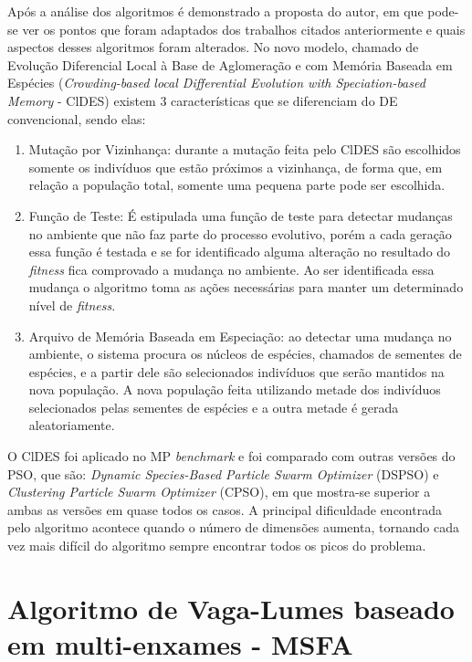 Após a análise dos algoritmos é demonstrado a proposta do autor, em que pode-se ver os pontos que foram adaptados dos trabalhos citados anteriormente e quais aspectos desses algoritmos foram alterados. No novo modelo, chamado de Evolução Diferencial Local à Base de Aglomeração e com Memória Baseada em Espécies (\textit{Crowding-based local Differential Evolution with Speciation-based Memory} - ClDES) existem 3 características que se diferenciam do DE convencional, sendo elas:

\begin{enumerate}
\item Mutação por Vizinhança: durante a mutação feita pelo ClDES são escolhidos somente os indivíduos que estão próximos a vizinhança, de forma que, em relação a população total, somente uma pequena parte pode ser escolhida.

\item Função de Teste: É estipulada uma função de teste para detectar mudanças no ambiente que não faz parte do processo evolutivo, porém a cada geração essa função é testada e se for identificado alguma alteração no resultado do \textit{fitness} fica comprovado a mudança no ambiente. Ao ser identificada essa mudança o algoritmo toma as ações necessárias para manter um determinado nível de \textit{fitness}.

\item Arquivo de Memória Baseada em Especiação: ao detectar uma mudança no ambiente, o sistema procura os núcleos de espécies, chamados de sementes de espécies, e a partir dele são selecionados indivíduos que serão mantidos na nova população. A nova população feita utilizando metade dos indivíduos selecionados pelas sementes de espécies e a outra metade é gerada aleatoriamente.
\end{enumerate}

O ClDES foi aplicado no MP \textit{benchmark} e foi comparado com outras versões do PSO, que são: \textit{Dynamic Species-Based Particle Swarm Optimizer} (DSPSO) e \textit{Clustering Particle Swarm Optimizer} (CPSO), em que mostra-se superior a ambas as versões em quase todos os casos. A principal dificuldade encontrada pelo algoritmo acontece quando o número de dimensões aumenta, tornando cada vez mais difícil do algoritmo sempre encontrar todos os picos do problema.

\section{Algoritmo de Vaga-Lumes baseado em multi-enxames - MSFA}
\label{sec:fa_behaviour}

